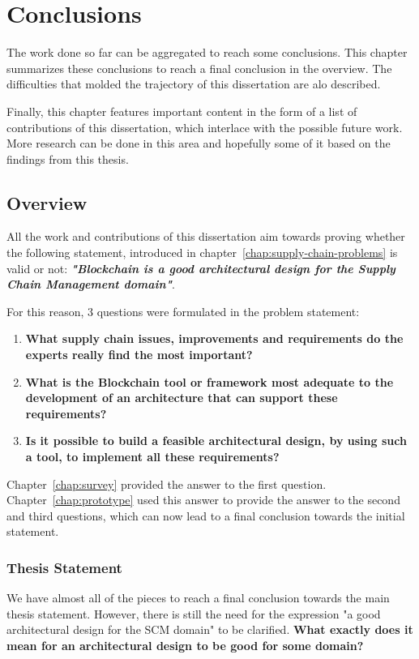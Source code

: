 \chapter{Conclusions}
\label{chap:conclusions}
\minitoc \mtcskip \noindent

The work done so far can be aggregated to reach some conclusions. This chapter summarizes these conclusions to reach a final conclusion in the overview. The difficulties that molded the trajectory of this dissertation are alo described.

Finally, this chapter features important content in the form of a list of contributions of this dissertation, which interlace with the possible future work. More research can be done in this area and hopefully some of it based on the findings from this thesis.

\section{Overview}

All the work and contributions of this dissertation aim towards proving whether the following statement, introduced in chapter~\ref{chap:supply-chain-problems} is valid or not: \textbf{\textit{"Blockchain is a good architectural design for the Supply Chain Management domain"}}.

 For this reason, 3 questions were formulated in the problem statement:
\begin{enumerate}
    \item \textbf{What supply chain issues, improvements and requirements do the experts really find the most important?}
    \item \textbf{What is the Blockchain tool or framework most adequate to the development of an architecture that can support these requirements?}
    \item \textbf{Is it possible to build a feasible architectural design, by using such a tool, to implement all these requirements?}
\end{enumerate}
    
Chapter~\ref{chap:survey} provided the answer to the first question. Chapter~\ref{chap:prototype} used this answer to provide the answer to the second and third questions, which can now lead to a final conclusion towards the initial statement.


\subsection*{Thesis Statement}
\par We have almost all of the pieces to reach a final conclusion towards the main thesis statement. However, there is still the need for the expression "a good architectural design for the SCM domain" to be clarified. \textbf{What exactly does it mean for an architectural design to be good for some domain?} 


